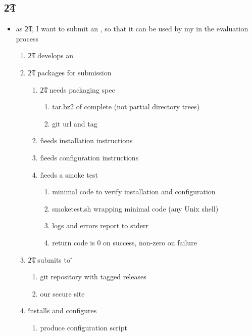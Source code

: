 \documentclass[8pt,letterpaper]{article} %
\newenvironment{slimlist}{
  \begin{itemize}
    \setlength{\topsep}{0pt}
    \setlength{\itemsep}{1pt}
    \setlength{\parsep}{0pt}
    \setlength{\parskip}{0pt}
}{\end{itemize}}
\newenvironment{mitemize}[1]{
  \begin{minipage}{\linewidth}
  \subsection*{#1}
  \begin{slimlist}
}{
\end{slimlist}
\end{minipage}
\vspace{1em}
}
\begin{document}
\begin{comment}
    The return format should allow us to resolve gaps cleanly when possible. Also should be able to fairly skip missing \ds{s}.
  \end{quote}
\item unpack \ds for use by \tev or \sol if on disk at location

\item revise \ds
\begin{quote}
  we should not need to revise unless we allow for automatic registration and need to update look-up, this is likely a case that is so infrequent that it can be ignored. 
\end{quote}
\end{mitemize}
\end{comment}

\begin{mitemize}{\t24}
\item as \t24, I want to submit an \eng, so that it can be used by my  in the evaluation process
  \begin{enumerate}
  \item \t24 develops an \eng
  \item \t24 packages \eng for submission
    \begin{enumerate}
    \item \t24 needs packaging spec
      \begin{enumerate}
      \item tar.bz2 of complete \eng (not partial directory trees)
      \item git url and tag
      \end{enumerate}
    \item \G needs installation instructions
    \item \G needs configuration instructions
    \item \G needs a smoke test
      \begin{enumerate}
      \item minimal code to verify \eng installation and configuration
      \item smoketest.sh wrapping minimal code (any Unix shell)
      \item logs and errors report to stderr
      \item return code is 0 on success, non-zero on failure
      \end{enumerate}
    \end{enumerate}
  \item \t24 submits \eng to \G
    \begin{enumerate}
    \item git repository with tagged releases
    \item our secure site
    \end{enumerate}
  \item \G installs and configures \eng
    \begin{enumerate}
    \item produce configuration script
    \end{enumerate}
  

\end{enumerate}
\end{mitemize}
\end{document}
